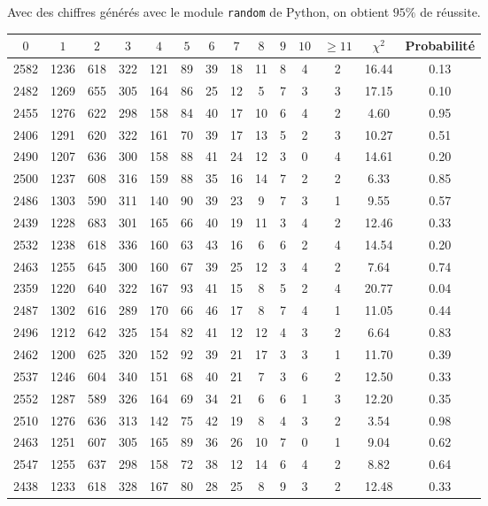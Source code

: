 \documentclass[12pt,a4paper]{article}
\begin{document}
\newpage
Avec des chiffres générés avec le module \texttt{random} de Python,
on obtient $95\%$ de réussite.
\begin{center}
\begin{tabular}{|c|c|c|c|c|c|c|c|c|c|c|c|c|c|}
\hline
$0$ & $1$ & $2$ & $3$ & $4$ & $5$ & $6$ & $7$ & $8$ & $9$ & $10$ & $\geq 11$ & $\chi^2$ & Probabilité \\ \hline
2582 & 1236 & 618 & 322 & 121 & 89 & 39 & 18 & 11 & 8 & 4 & 2 & 16.44 &  0.13\\ \hline
2482 & 1269 & 655 & 305 & 164 & 86 & 25 & 12 & 5 & 7 & 3 & 3 & 17.15 &  0.10\\ \hline
2455 & 1276 & 622 & 298 & 158 & 84 & 40 & 17 & 10 & 6 & 4 & 2 &  4.60 &  0.95\\ \hline
2406 & 1291 & 620 & 322 & 161 & 70 & 39 & 17 & 13 & 5 & 2 & 3 & 10.27 &  0.51\\ \hline
2490 & 1207 & 636 & 300 & 158 & 88 & 41 & 24 & 12 & 3 & 0 & 4 & 14.61 &  0.20\\ \hline
2500 & 1237 & 608 & 316 & 159 & 88 & 35 & 16 & 14 & 7 & 2 & 2 &  6.33 &  0.85\\ \hline
2486 & 1303 & 590 & 311 & 140 & 90 & 39 & 23 & 9 & 7 & 3 & 1 &  9.55 &  0.57\\ \hline
2439 & 1228 & 683 & 301 & 165 & 66 & 40 & 19 & 11 & 3 & 4 & 2 & 12.46 &  0.33\\ \hline
2532 & 1238 & 618 & 336 & 160 & 63 & 43 & 16 & 6 & 6 & 2 & 4 & 14.54 &  0.20\\ \hline
2463 & 1255 & 645 & 300 & 160 & 67 & 39 & 25 & 12 & 3 & 4 & 2 &  7.64 &  0.74\\ \hline
2359 & 1220 & 640 & 322 & 167 & 93 & 41 & 15 & 8 & 5 & 2 & 4 & 20.77 &  0.04\\ \hline
2487 & 1302 & 616 & 289 & 170 & 66 & 46 & 17 & 8 & 7 & 4 & 1 & 11.05 &  0.44\\ \hline
2496 & 1212 & 642 & 325 & 154 & 82 & 41 & 12 & 12 & 4 & 3 & 2 &  6.64 &  0.83\\ \hline
2462 & 1200 & 625 & 320 & 152 & 92 & 39 & 21 & 17 & 3 & 3 & 1 & 11.70 &  0.39\\ \hline
2537 & 1246 & 604 & 340 & 151 & 68 & 40 & 21 & 7 & 3 & 6 & 2 & 12.50 &  0.33\\ \hline
2552 & 1287 & 589 & 326 & 164 & 69 & 34 & 21 & 6 & 6 & 1 & 3 & 12.20 &  0.35\\ \hline
2510 & 1276 & 636 & 313 & 142 & 75 & 42 & 19 & 8 & 4 & 3 & 2 &  3.54 &  0.98\\ \hline
2463 & 1251 & 607 & 305 & 165 & 89 & 36 & 26 & 10 & 7 & 0 & 1 &  9.04 &  0.62\\ \hline
2547 & 1255 & 637 & 298 & 158 & 72 & 38 & 12 & 14 & 6 & 4 & 2 &  8.82 &  0.64\\ \hline
2438 & 1233 & 618 & 328 & 167 & 80 & 28 & 25 & 8 & 9 & 3 & 2 & 12.48 &  0.33\\ \hline
\end{tabular}
\end{center}
\end{document}
